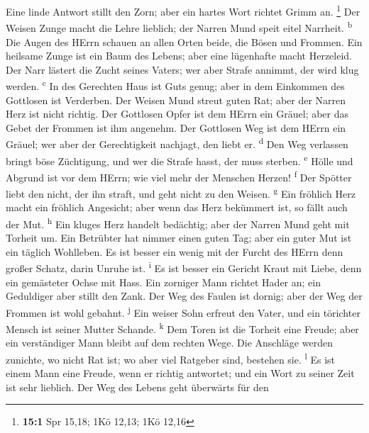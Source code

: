  Eine linde Antwort stillt den Zorn; aber ein hartes Wort
richtet Grimm an. \footnote{\textbf{15:1} Spr 15,18; 1Kö 12,13; 1Kö
  12,16}  Der Weisen Zunge macht die Lehre lieblich; der
Narren Mund speit eitel Narrheit. \textsuperscript{b}  Die
Augen des HErrn schauen an allen Orten beide, die Bösen und Frommen.
 Ein heilsame Zunge ist ein Baum des Lebens; aber eine
lügenhafte macht Herzeleid.  Der Narr lästert die Zucht
seines Vaters; wer aber Strafe annimmt, der wird klug werden.
\textsuperscript{c}  In des Gerechten Haus ist Guts genug;
aber in dem Einkommen des Gottlosen ist Verderben.  Der
Weisen Mund streut guten Rat; aber der Narren Herz ist nicht richtig.
 Der Gottlosen Opfer ist dem HErrn ein Gräuel; aber das
Gebet der Frommen ist ihm angenehm.  Der Gottlosen Weg ist
dem HErrn ein Gräuel; wer aber der Gerechtigkeit nachjagt, den liebt er.
\textsuperscript{d}  Den Weg verlassen bringt böse
Züchtigung, und wer die Strafe hasst, der muss sterben.
\textsuperscript{e}  Hölle und Abgrund ist vor dem HErrn;
wie viel mehr der Menschen Herzen! \textsuperscript{f} 
Der Spötter liebt den nicht, der ihn straft, und geht nicht zu den
Weisen. \textsuperscript{g}  Ein fröhlich Herz macht ein
fröhlich Angesicht; aber wenn das Herz bekümmert ist, so fällt auch der
Mut. \textsuperscript{h}  Ein kluges Herz handelt
bedächtig; aber der Narren Mund geht mit Torheit um.  Ein
Betrübter hat nimmer einen guten Tag; aber ein guter Mut ist ein täglich
Wohlleben.  Es ist besser ein wenig mit der Furcht des
HErrn denn großer Schatz, darin Unruhe ist. \textsuperscript{i}
 Es ist besser ein Gericht Kraut mit Liebe, denn ein
gemästeter Ochse mit Hass.  Ein zorniger Mann richtet
Hader an; ein Geduldiger aber stillt den Zank.  Der Weg
des Faulen ist dornig; aber der Weg der Frommen ist wohl gebahnt.
\textsuperscript{j}  Ein weiser Sohn erfreut den Vater,
und ein törichter Mensch ist seiner Mutter Schande. \textsuperscript{k}
 Dem Toren ist die Torheit eine Freude; aber ein
verständiger Mann bleibt auf dem rechten Wege.  Die
Anschläge werden zunichte, wo nicht Rat ist; wo aber viel Ratgeber sind,
bestehen sie. \textsuperscript{l}  Es ist einem Mann eine
Freude, wenn er richtig antwortet; und ein Wort zu seiner Zeit ist sehr
lieblich.  Der Weg des Lebens geht überwärts für den
